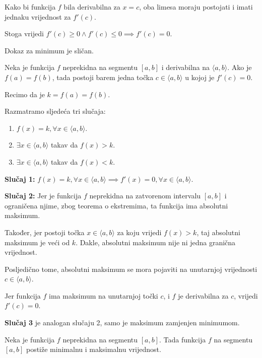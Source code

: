 Kako bi funkcija $f$ bila derivabilna za $x=c$, oba limesa moraju postojati i
imati jednaku vrijednost za $f'(c)$.

Stoga vrijedi $f'(c)\geq 0 \land f'(c)\leq 0 \implies f'(c)=0$.

Dokaz za minimum je sličan.

\begin{theorembox}
    Neka je funkcija $f$ neprekidna na segmentu $[a,b]$ i derivabilna na $\langle a,b \rangle$.
    Ako je $f(a) = f(b)$, tada postoji barem jedna točka $c\in\langle a,b \rangle$
    u kojoj je $f'(c)=0$.
\end{theorembox}

Recimo da je $k=f(a)=f(b)$.

\noindent
Razmatramo sljedeća tri slučaja:
\begin{enumerate}
    \item $f(x) = k, \forall x\in \langle a,b \rangle$.
    \item $\exists x\in \langle a,b \rangle$ takav da $f(x) > k$.
    \item $\exists x\in \langle a,b \rangle$ takav da $f(x) < k$.
\end{enumerate}

\noindent
\textbf{Slučaj 1:} $f(x) = k, \forall x\in \langle a,b \rangle \implies f'(x) = 0, \forall x\in \langle a,b \rangle$.

\bigskip
\noindent
\textbf{Slučaj 2:} Jer je funkcija $f$ neprekidna na zatvorenom intervalu $[a,b]$
i ograničena njime, zbog teorema o ekstremima, ta funkcija ima absolutni maksimum.

Također, jer postoji točka $x\in \langle a,b \rangle$ za koju vrijedi $f(x)>k$,
taj absolutni maksimum je veći od $k$.
Dakle, absolutni maksimum nije ni jedna granična vrijednost.

Posljedično tome, absolutni maksimum se mora pojaviti na unutarnjoj vrijednosti
$c\in\langle a,b \rangle$.

Jer funkcija $f$ ima maksimum na unutarnjoj točki $c$, i $f$ je derivabilna za
$c$, vrijedi $f'(c)=0$.

\bigskip
\noindent
\textbf{Slučaj 3} je analogan slučaju 2, samo je maksimum zamjenjen minimumom.

\newpage
\begin{theorembox}
    Neka je funkcija $f$ neprekidna na segmentu $[a,b]$. Tada funkcija $f$ na segmentu
    $[a,b]$ postiže minimalnu i maksimalnu vrijednost.
\end{theorembox}

